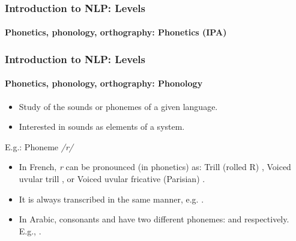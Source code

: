 \documentclass[xcolor=table]{beamer}
\begin{document}
\begin{frame}
\frametitle{Introduction to NLP: Levels}
\framesubtitle{Phonetics, phonology, orthography: Phonetics (IPA)}

\begin{center}
\end{center}

\end{frame}

\begin{frame}
\frametitle{Introduction to NLP: Levels}
\framesubtitle{Phonetics, phonology, orthography: Phonology}

\begin{itemize}
	\item Study of the sounds or phonemes of a given language.
	\item Interested in sounds as elements of a system.
\end{itemize}

\begin{exampleblock}{E.g.: Phoneme \textit{/r/}}
	\begin{itemize}
		\item In French, \textit{r} can be pronounced (in phonetics) as: Trill (rolled R) \expword{\textipa{[r]}}, Voiced uvular trill \expword{\textipa{[\;R]}}, or Voiced uvular fricative (Parisian) \expword{\textipa{[K]}}.
		\item It is always transcribed in the same manner, e.g. .
		\item In Arabic, consonants  and  have two different phonemes:  and  respectively. 
		E.g., .
	\end{itemize}
\end{exampleblock}

\end{frame}
\end{document}
